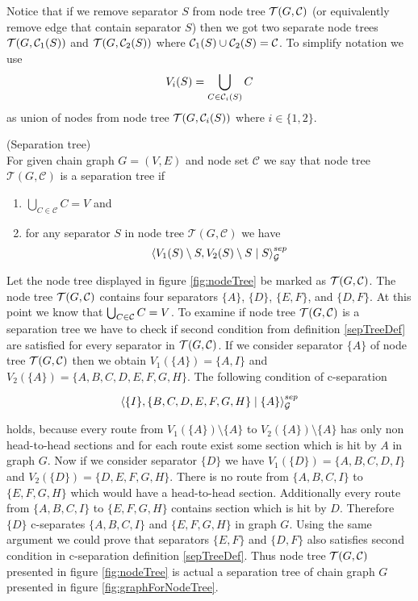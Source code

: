 Notice that if we remove separator $S$ from node tree $\mathcal{T}(G, \mathcal{C})$ (or equivalently remove edge that contain separator $S$) then we got two separate node trees $\mathcal{T}(G, \mathcal{C}_1(S))$ and $\mathcal{T}(G, \mathcal{C}_2(S))$ where 
$\mathcal{C}_1(S) \cup \mathcal{C}_2(S) = \mathcal{C}$. To simplify notation we use 
$$ V_i(S) = \bigcup_{C \in \mathcal{C}_i(S)} C$$
as union of nodes from node tree $\mathcal{T}(G, \mathcal{C}_i(S))$ where $i \in \{1, 2\}$.

\begin{defi} \label{sepTreeDef} (Separation tree) \\
	For given chain graph $G = (V, E)$ and node set $\mathcal{C}$ we say that node tree $\mathcal{T}(G, \mathcal{C})$
	is a separation tree if 

	\begin{enumerate}
		\item $\bigcup_{C \in \mathcal{C}} C = V$ and
		\item for any separator $S$ in node tree $\mathcal{T}(G, \mathcal{C})$ we have  
		$$ \left\langle V_1(S) \setminus S , V_2(S) \setminus S \mid S \right\rangle_{\mathcal{G}}^{sep} $$
	\end{enumerate}	
	
\end{defi}
Let the node tree displayed in figure \ref{fig:nodeTree} be marked as $\mathcal{T}(G, \mathcal{C})$. 
The node tree $\mathcal{T}(G, \mathcal{C})$ contains four separators $\{A \}$, $\{D \}$, $\{E, F \}$, and $\{D, F \}$. At this point we know that 
$ \bigcup_{C \in \mathcal{C}} C = V$. To examine if node tree $\mathcal{T}(G, \mathcal{C})$ is a separation tree we have to check if second condition 
from definition \ref{sepTreeDef} are satisfied for every separator in $\mathcal{T}(G, \mathcal{C})$. 
If we consider separator $\{A \}$ of node tree $\mathcal{T}(G, \mathcal{C})$ then we obtain $V_1(\{A \}) = \{ A, I \}$ and 
$V_2(\{A \}) = \{ A, B, C, D, E, F, G, H\}$. The following condition of c-separation 

\begin{equation}
	\left\langle  \{I \}  ,  \{B, C, D, E, F, G, H \}  \mid  \{ A \}  \right\rangle_{\mathcal{G}}^{sep}
\end{equation}

holds, because every route from $V_1(\{A \}) \setminus \{A \}$ to $V_2(\{A \}) \setminus \{A \}$ has only non head-to-head sections 
and for each route 
exist some section which is hit by $A$ in graph $G$. Now if we consider separator $\{ D \}$ we have $V_1(\{D \}) = \{ A, B, C, D, I\}$ 
and $V_2(\{D \}) = \{ D, E, F, G, H\}$. There is no route from $\{A, B, C, I \}$ to $\{ E, F, G, H\}$ which would have
a head-to-head section. Additionally every route from $\{A, B, C, I \}$ to $\{ E, F, G, H\}$ contains section which is hit by $D$.
Therefore $\{D \}$ c-separates 
$\{A, B, C, I \}$ and $\{ E, F, G, H\}$ in graph $G$. Using the same argument we could prove that separators $\{E, F\}$ and 
$\{ D, F\}$ also satisfies second condition in c-separation definition \ref{sepTreeDef}. Thus node tree $\mathcal{T}(G, \mathcal{C})$ presented
in figure \ref{fig:nodeTree} is actual a separation tree of chain graph $G$ presented in figure \ref{fig:graphForNodeTree}.



